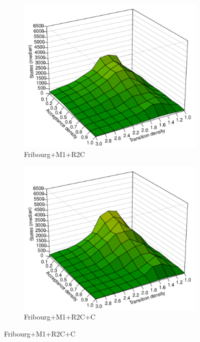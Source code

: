 \begin{figure}[ht]
  \hfill
  \begin{subfigure}[t]{\perspwidth\textwidth}
  \centering
  \includegraphics[width=\textwidth]{figures/r/internal/goal/s.median.Fribourg+M1+R2C.pdf}
  \caption{Fribourg+M1+R2C}
  \end{subfigure}
  \hfill
  \begin{subfigure}[t]{\perspwidth\textwidth}
  \centering
  \includegraphics[width=\textwidth]{figures/r/internal/goal/s.median.Fribourg+M1+R2C+C.pdf}
  \caption{Fribourg+M1+R2C+C}
  \end{subfigure}
  \hfill
\end{figure}

